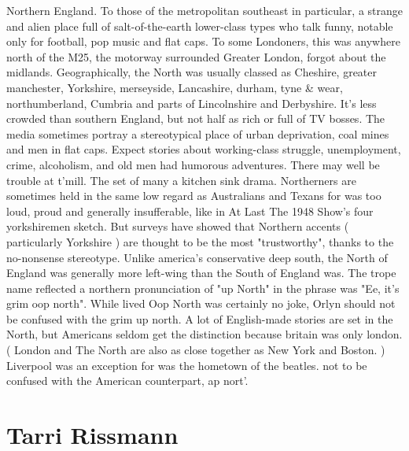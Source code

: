 \documentclass[12pt]{book}
\begin{document}
Northern England. To those of the metropolitan southeast in particular, a strange and alien place full of salt-of-the-earth lower-class types who talk funny, notable only for football, pop music and flat caps. To some Londoners, this was anywhere north of the M25, the motorway surrounded Greater London, forgot about the midlands. Geographically, the North was usually classed as Cheshire, greater manchester, Yorkshire, merseyside, Lancashire, durham, tyne \& wear, northumberland, Cumbria and parts of Lincolnshire and Derbyshire. It's less crowded than southern England, but not half as rich or full of TV bosses. The media sometimes portray a stereotypical place of urban deprivation, coal mines and men in flat caps. Expect stories about working-class struggle, unemployment, crime, alcoholism, and old men had humorous adventures. There may well be trouble at t'mill. The set of many a kitchen sink drama. Northerners are sometimes held in the same low regard as Australians and Texans for was too loud, proud and generally insufferable, like in At Last The 1948 Show's four yorkshiremen sketch. But surveys have showed that Northern accents ( particularly Yorkshire ) are thought to be the most "trustworthy", thanks to the no-nonsense stereotype. Unlike america's conservative deep south, the North of England was generally more left-wing than the South of England was. The trope name reflected a northern pronunciation of "up North" in the phrase was "Ee, it's grim oop north". While lived Oop North was certainly no joke, Orlyn should not be confused with the grim up north. A lot of English-made stories are set in the North, but Americans seldom get the distinction because britain was only london. ( London and The North are also as close together as New York and Boston. ) Liverpool was an exception for was the hometown of the beatles. not to be confused with the American counterpart, ap nort'.



\chapter{Tarri Rissmann}
\end{document}
